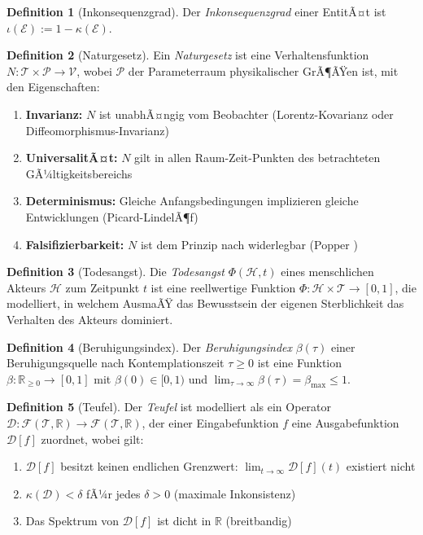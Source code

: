 ﻿\documentclass[a4paper,12pt]{article}
\theoremstyle{definition}
\newtheorem{definition}{Definition}
\begin{document}
\begin{definition}[Inkonsequenzgrad]
Der \emph{Inkonsequenzgrad} einer EntitÃ¤t ist $\iota(\mathcal{E}) := 1 - \kappa(\mathcal{E})$.
\end{definition}

\begin{definition}[Naturgesetz]
Ein \emph{Naturgesetz} ist eine Verhaltensfunktion $N: \mathcal{T} \times \mathcal{P} \to \mathcal{V}$, wobei $\mathcal{P}$ der Parameterraum physikalischer GrÃ¶ÃŸen ist, mit den Eigenschaften:
\begin{enumerate}
\item \textbf{Invarianz:} $N$ ist unabhÃ¤ngig vom Beobachter (Lorentz-Kovarianz oder Diffeomorphismus-Invarianz)
\item \textbf{UniversalitÃ¤t:} $N$ gilt in allen Raum-Zeit-Punkten des betrachteten GÃ¼ltigkeitsbereichs
\item \textbf{Determinismus:} Gleiche Anfangsbedingungen implizieren gleiche Entwicklungen (Picard-LindelÃ¶f)
\item \textbf{Falsifizierbarkeit:} $N$ ist dem Prinzip nach widerlegbar (Popper \cite{popper1934})
\end{enumerate}
\end{definition}

\begin{definition}[Todesangst]
Die \emph{Todesangst} $\Phi(\mathcal{H}, t)$ eines menschlichen Akteurs $\mathcal{H}$ zum Zeitpunkt $t$ ist eine reellwertige Funktion $\Phi: \mathcal{H} \times \mathcal{T} \to [0,1]$, die modelliert, in welchem AusmaÃŸ das Bewusstsein der eigenen Sterblichkeit das Verhalten des Akteurs dominiert.
\end{definition}

\begin{definition}[Beruhigungsindex]
Der \emph{Beruhigungsindex} $\beta(\tau)$ einer Beruhigungsquelle nach Kontemplationszeit $\tau \geq 0$ ist eine Funktion $\beta: \mathbb{R}_{\geq 0} \to [0,1]$ mit $\beta(0) \in [0,1)$ und $\lim_{\tau \to \infty} \beta(\tau) = \beta_{\max} \leq 1$.
\end{definition}

\begin{definition}[Teufel]
\label{def:teufel}
Der \emph{Teufel} ist modelliert als ein Operator $\mathcal{D}: \mathcal{F}(\mathcal{T}, \mathbb{R}) \to \mathcal{F}(\mathcal{T}, \mathbb{R})$, der einer Eingabefunktion $f$ eine Ausgabefunktion $\mathcal{D}[f]$ zuordnet, wobei gilt:
\begin{enumerate}
\item $\mathcal{D}[f]$ besitzt keinen endlichen Grenzwert: $\lim_{t \to \infty} \mathcal{D}[f](t)$ existiert nicht
\item $\kappa(\mathcal{D}) < \delta$ fÃ¼r jedes $\delta > 0$ (maximale Inkonsistenz)
\item Das Spektrum von $\mathcal{D}[f]$ ist dicht in $\mathbb{R}$ (breitbandig)
\end{enumerate}
\end{definition}
\end{document}
